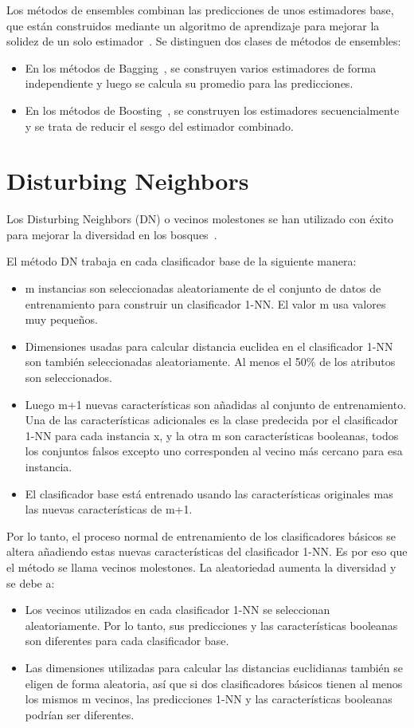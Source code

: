 Los métodos de ensembles combinan las predicciones de unos estimadores base, que están construidos mediante un algoritmo de aprendizaje para mejorar la solidez de un solo estimador~\cite{ensemble}.
Se distinguen dos clases de métodos de ensembles:
	\begin{itemize}
		\item En los métodos de Bagging~\cite{bagging}, se construyen varios estimadores de forma independiente y luego se calcula su promedio para las predicciones.
		\item En los métodos de Boosting~\cite{boosting}, se construyen los estimadores secuencialmente y se trata de reducir el sesgo del estimador combinado. 
	\end{itemize}

\section{Disturbing Neighbors}

Los Disturbing Neighbors (DN) o vecinos molestones se han utilizado con éxito para mejorar la diversidad en los bosques~\cite{disturbingneighbors}.

El método DN trabaja en cada clasificador base de la siguiente manera:
\begin{itemize}
    \item m instancias son seleccionadas aleatoriamente de el conjunto de datos de entrenamiento para construir un clasificador 1-NN. El valor m usa valores muy pequeños.
    \item Dimensiones usadas para calcular distancia euclidea en el clasificador 1-NN son también seleccionadas aleatoriamente. Al menos el 50\% de los atributos son seleccionados.
    \item Luego m+1 nuevas características son añadidas al conjunto de entrenamiento. Una de las características adicionales es la clase predecida por el clasificador 1-NN para cada instancia x, y la otra m son características booleanas, todos los conjuntos falsos excepto uno corresponden al vecino más cercano para esa instancia.
    \item El clasificador base está entrenado usando las características originales mas las nuevas características de m+1. 
\end{itemize}
Por lo tanto, el proceso normal de entrenamiento de los clasificadores básicos se altera añadiendo estas nuevas características del clasificador 1-NN. Es por eso que el método se llama vecinos molestones. La aleatoriedad aumenta la diversidad y se debe a:
\begin{itemize}
\item Los vecinos utilizados en cada clasificador 1-NN se seleccionan aleatoriamente. Por lo tanto, sus predicciones y las características booleanas son diferentes para cada clasificador base.
\item Las dimensiones utilizadas para calcular las distancias euclidianas también se eligen de forma aleatoria, así que si dos clasificadores básicos tienen al menos los mismos m vecinos, las predicciones 1-NN y las características booleanas podrían ser diferentes.
\end{itemize}

